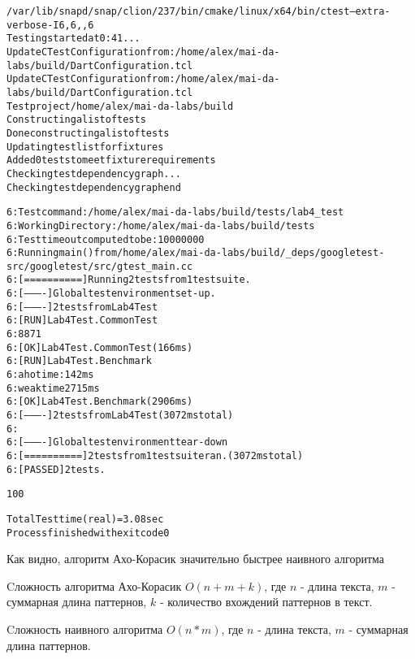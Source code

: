 \begin{alltt}
    /var/lib/snapd/snap/clion/237/bin/cmake/linux/x64/bin/ctest --extra-verbose -I 6,6,,6
    Testing started at 0:41 ...
    UpdateCTestConfiguration  from :/home/alex/mai-da-labs/build/DartConfiguration.tcl
    UpdateCTestConfiguration  from :/home/alex/mai-da-labs/build/DartConfiguration.tcl
    Test project /home/alex/mai-da-labs/build
    Constructing a list of tests
    Done constructing a list of tests
    Updating test list for fixtures
    Added 0 tests to meet fixture requirements
    Checking test dependency graph...
    Checking test dependency graph end

    6: Test command: /home/alex/mai-da-labs/build/tests/lab4_test
    6: Working Directory: /home/alex/mai-da-labs/build/tests
    6: Test timeout computed to be: 10000000
    6: Running main() from /home/alex/mai-da-labs/build/_deps/googletest-src/googletest/src/gtest_main.cc
    6: [==========] Running 2 tests from 1 test suite.
    6: [----------] Global test environment set-up.
    6: [----------] 2 tests from Lab4Test
    6: [ RUN      ] Lab4Test.CommonTest
    6: 8871
    6: [       OK ] Lab4Test.CommonTest (166 ms)
    6: [ RUN      ] Lab4Test.Benchmark
    6: aho time: 142 ms
    6: weak time 2715 ms
    6: [       OK ] Lab4Test.Benchmark (2906 ms)
    6: [----------] 2 tests from Lab4Test (3072 ms total)
    6:
    6: [----------] Global test environment tear-down
    6: [==========] 2 tests from 1 test suite ran. (3072 ms total)
    6: [  PASSED  ] 2 tests.

    100% tests passed, 0 tests failed out of 1

    Total Test time (real) =   3.08 sec
    Process finished with exit code 0

\end{alltt}

Как видно, алгоритм Ахо-Корасик значительно быстрее наивного алгоритма

Cложность алгоритма Ахо-Корасик $O(n + m + k)$, где $n$ - длина текста, $m$ - суммарная длина паттернов, $k$ - количество вхождений паттернов в текст.

Cложность наивного алгоритма $O(n * m)$, где $n$ - длина текста, $m$ - суммарная длина паттернов.


\pagebreak

